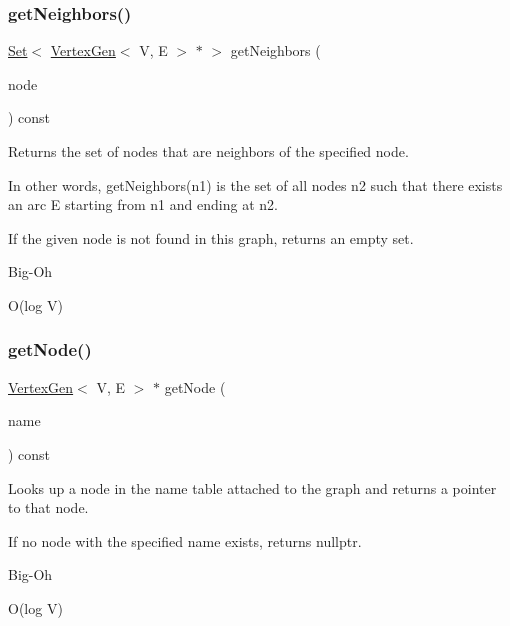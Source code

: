 \subsubsection{\texorpdfstring{get\+Neighbors()}{getNeighbors()}\hspace{0.1cm}{\footnotesize\ttfamily [2/2]}}
{\footnotesize\ttfamily \mbox{\hyperlink{classstanfordcpplib_1_1collections_1_1GenericSet}{Set}}$<$ \mbox{\hyperlink{classVertexGen}{Vertex\+Gen}}$<$ V, E $>$  $\ast$ $>$ get\+Neighbors (\begin{DoxyParamCaption}\item[{const std\+::string \&}]{node }\end{DoxyParamCaption}) const\hspace{0.3cm}{\ttfamily [inherited]}}



Returns the set of nodes that are neighbors of the specified node. 

In other words, get\+Neighbors(n1) is the set of all nodes n2 such that there exists an arc E starting from n1 and ending at n2.

If the given node is not found in this graph, returns an empty set. \begin{DoxyRefDesc}{Big-\/\+Oh}
\item[\mbox{\hyperlink{BigOh__BigOh000074}{Big-\/\+Oh}}]O(log V) \end{DoxyRefDesc}
\mbox{\label{classGraph_a81487976cf0e576047333c85463c33aa}} 
\subsubsection{\texorpdfstring{get\+Node()}{getNode()}}
{\footnotesize\ttfamily \mbox{\hyperlink{classVertexGen}{Vertex\+Gen}}$<$ V, E $>$  $\ast$ get\+Node (\begin{DoxyParamCaption}\item[{const std\+::string \&}]{name }\end{DoxyParamCaption}) const\hspace{0.3cm}{\ttfamily [inherited]}}



Looks up a node in the name table attached to the graph and returns a pointer to that node. 

If no node with the specified name exists, returns {\ttfamily nullptr}. \begin{DoxyRefDesc}{Big-\/\+Oh}
\item[\mbox{\hyperlink{BigOh__BigOh000075}{Big-\/\+Oh}}]O(log V) \end{DoxyRefDesc}
\mbox{\label{classGraph_a3c6f37932f377dd2bf4fec61343a916d}} 
